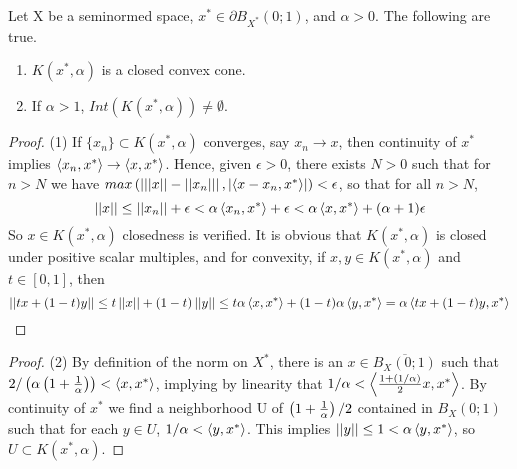 \begin{rmk}\rm
    \label{rmk:ClosedConvexCone}
    Let X be a seminormed space, $x^* \in \partial B_{X^*}(0;1)$, and $\alpha > 0$. The following are true. 
    \begin{enumerate} 
        \item $K(x^*,\alpha)$ is a closed convex cone. 
        \item If $\alpha > 1$, $Int(K(x^*,\alpha)) \neq \emptyset$. 
    \end{enumerate} 
    \begin{proof}(1)
        If $\{x_n\} \subset K(x^*,\alpha)$ converges, say $x_n \to x$, then continuity of $x^*$ implies $\left\langle x_n,x^* \right\rangle \to \left\langle x,x^* \right\rangle$. Hence, given $\epsilon > 0$, there exists $N>0$ such that for $n>N$ we have $max\left( \left| ||x||-||x_n|| \right|,\left| \left\langle x-x_n,x^* \right\rangle \right|\right) < \epsilon$, so that for all $n>N$,
        \begin{equation}
            \left|\left| x \right|\right|\leq \left|\left| x_n \right|\right| +\epsilon < \alpha \left\langle x_n,x^* \right\rangle + \epsilon < \alpha \left\langle x,x^* \right\rangle+ (\alpha+1)\epsilon
        \end{equation}
        So $x \in K(x^*,\alpha)$ closedness is verified. It is obvious that $K(x^*,\alpha)$ is closed under positive scalar multiples, and for convexity, if $x,y \in K(x^*,\alpha)$ and $t \in [0,1]$, then
        \begin{equation}
            \left|\left| tx+(1-t)y \right|\right| \leq t\left|\left| x \right|\right|+(1-t)\left|\left| y \right|\right| \leq t \alpha \left\langle x,x^* \right\rangle+(1-t) \alpha \left\langle y,x^* \right\rangle = \alpha \left\langle tx+(1-t)y,x^* \right\rangle
        \end{equation}
    \end{proof} 
    \begin{proof}(2)
        By definition of the norm on $X^*$, there is an $x \in \overline{B_X(0;1)}$ such that $2/\left( \alpha \left( 1+\frac{1}{\alpha}\right)\right)< \left\langle x,x^* \right\rangle$, implying by linearity that $1/\alpha < \left\langle \frac{1+(1/\alpha)}{2}x,x^* \right\rangle$. By continuity of $x^*$ we find a neighborhood U of $\left( 1+\frac{1}{\alpha}\right)/2$ contained in $B_X(0;1)$ such that for each $y \in U$, $1/\alpha < \left\langle y,x^* \right\rangle$. This implies $||y|| \leq 1 < \alpha \left\langle y,x^* \right\rangle$, so $U \subset K(x^*,\alpha)$.
    \end{proof} 
\end{rmk}
